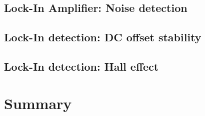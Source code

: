 \documentclass{article}
\begin{document}
\subsection{Lock-In Amplifier: Noise detection}
\label{results: noise detection}


\subsection{Lock-In detection: DC offset stability}



\subsection{Lock-In detection: Hall effect}



\section{Summary}

\cite{abcd}


\end{document}
